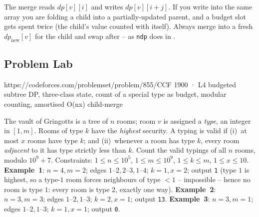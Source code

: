 \begin{warningbox}
The merge reads $\mathit{dp}[v][i]$ and writes $\mathit{dp}[v][i+j]$. If you
write into the same array you are folding a child into a partially-updated
parent, and a budget slot gets spent twice (the child's value counted with
itself). Always merge into a fresh $\mathit{dp}_{\text{new}}[v]$ for the child
and swap after -- as \lstinline{ndp} does in .
\end{warningbox}

\subsection{Problem Lab}

  {https://codeforces.com/problemset/problem/855/C}{CF 1900 · L4}
  {budgeted subtree DP, three-class state, count of a special type as budget,
   modular counting, amortised O(nx) child-merge}

\begin{problemstatement}
The vault of Gringotts is a tree of $n$ rooms; room $v$ is assigned a
\emph{type}, an integer in $[1, m]$. Rooms of type $k$ have the \emph{highest}
security. A typing is valid if (i)~at most $x$ rooms have type $k$; and
(ii)~whenever a room has type $k$, every room \emph{adjacent} to it has type
strictly less than $k$. Count the valid typings of all $n$ rooms, modulo
$10^9+7$. Constraints: $1 \le n \le 10^5$, $1 \le m \le 10^9$,
$1 \le k \le m$, $1 \le x \le 10$. \textbf{Example~1}: $n=4, m=2$; edges
$1\text{--}2, 2\text{--}3, 1\text{--}4$; $k=1, x=2$; output \texttt{1} (type $1$
is highest, so a type-$1$ room forces neighbours of type $<1$ -- impossible --
hence no room is type $1$: every room is type $2$, exactly one way).
\textbf{Example~2}: $n=3, m=3$; edges $1\text{--}2, 1\text{--}3$; $k=2, x=1$;
output \texttt{13}. \textbf{Example~3}: $n=3, m=1$; edges $1\text{--}2, 1\text{--}3$;
$k=1, x=1$; output \texttt{0}.
\end{problemstatement}

